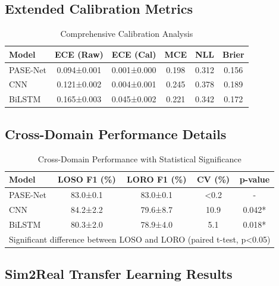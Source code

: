\documentclass[10pt,journal,compsoc]{IEEEtran}
\begin{document}
\subsection{Extended Calibration Metrics}

\begin{table}[h!]
\centering
\caption{Comprehensive Calibration Analysis}
\label{tab:s3_calibration}
\begin{tabular}{@{}lccccc@{}}
\toprule
\textbf{Model} & \textbf{ECE (Raw)} & \textbf{ECE (Cal)} & \textbf{MCE} & \textbf{NLL} & \textbf{Brier} \\
\midrule
PASE-Net & 0.094±0.001 & 0.001±0.000 & 0.198 & 0.312 & 0.156 \\
CNN & 0.121±0.002 & 0.004±0.001 & 0.245 & 0.378 & 0.189 \\
BiLSTM & 0.165±0.003 & 0.045±0.002 & 0.221 & 0.342 & 0.172 \\
\bottomrule
\end{tabular}
\end{table}

\subsection{Cross-Domain Performance Details}

\begin{table}[h!]
\centering
\caption{Cross-Domain Performance with Statistical Significance}
\label{tab:s4_cross_domain}
\begin{tabular}{@{}lcccc@{}}
\toprule
\textbf{Model} & \textbf{LOSO F1 (\%)} & \textbf{LORO F1 (\%)} & \textbf{CV (\%)} & \textbf{p-value} \\
\midrule
PASE-Net & 83.0±0.1 & 83.0±0.1 & <0.2 & - \\
CNN & 84.2±2.2 & 79.6±8.7 & 10.9 & 0.042* \\
BiLSTM & 80.3±2.0 & 78.9±4.0 & 5.1 & 0.018* \\
\midrule
\multicolumn{5}{l}{\small *Significant difference between LOSO and LORO (paired t-test, p<0.05)} \\
\bottomrule
\end{tabular}
\end{table}

\subsection{Sim2Real Transfer Learning Results}
\end{document}
